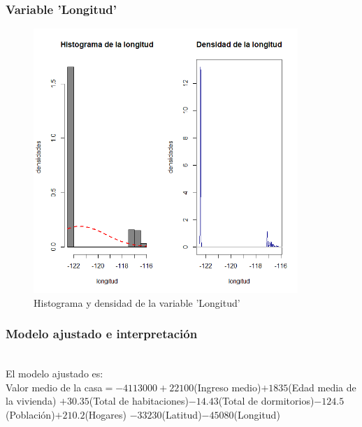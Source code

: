 \documentclass[12pt]{beamer}
\begin{document}
\begin{frame}
\frametitle{Variable 'Longitud'}
\begin{figure}[!h]
    \begin{center}
        \includegraphics[width=10cm]{imagenes/9.png}
        \caption{Histograma y densidad de la variable 'Longitud'}
        \label{fig:Densidad}
    \end{center}
\end{figure}
\end{frame}
\begin{frame}
\frametitle{Modelo ajustado e interpretación}
~\\ El modelo ajustado es:
~\\ Valor medio de la casa$=-4113000+22100$(Ingreso medio)$+1835$(Edad media de la vivienda)
$+30.35$(Total de habitaciones)$-14.43$(Total de dormitorios)$-124.5$(Población)$+210.2$(Hogares)
$-33230$(Latitud)$-45080$(Longitud)
\end{frame}
\end{document}
